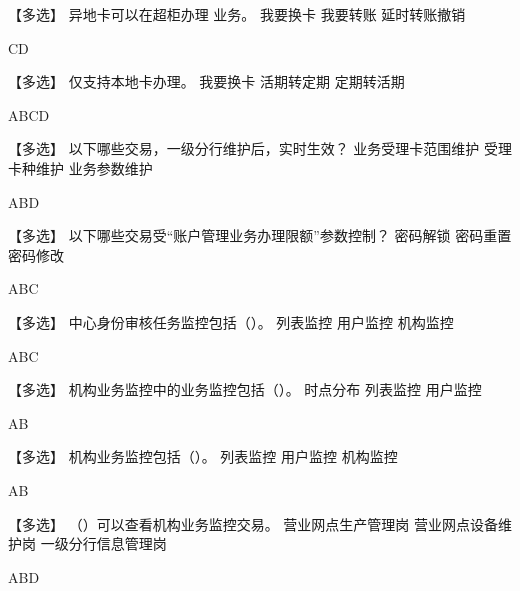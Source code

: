 \documentclass[kindlepaper]{BHCexam4kindle}
\begin{document}
\begin{questions}
\qs 【多选】 异地卡可以在超柜办理     业务。 \xx
{} {  我要换卡 } { 我要转账 } { 延时转账撤销 }
\begin{solution} CD \end{solution}
\qs 【多选】      仅支持本地卡办理。 \xx
{} {  我要换卡 } { 活期转定期 } { 定期转活期 }
\begin{solution} ABCD \end{solution}
\qs 【多选】 以下哪些交易，一级分行维护后，实时生效？ \xx
{} {  业务受理卡范围维护 } { 受理卡种维护 } { 业务参数维护 }
\begin{solution} ABD \end{solution}
\qs 【多选】 以下哪些交易受“账户管理业务办理限额”参数控制？ \xx
{} {  密码解锁 } { 密码重置 } { 密码修改 }
\begin{solution} ABC \end{solution}
\qs 【多选】 中心身份审核任务监控包括（）。 \xx
{} {  列表监控 } { 用户监控 } { 机构监控 }
\begin{solution} ABC \end{solution}
\qs 【多选】 机构业务监控中的业务监控包括（）。 \xx
{} {  时点分布 } { 列表监控 } { 用户监控 }
\begin{solution} AB \end{solution}
\qs 【多选】 机构业务监控包括（）。 \xx
{} {  列表监控 } { 用户监控 } { 机构监控 }
\begin{solution} AB \end{solution}
\qs 【多选】 （）可以查看机构业务监控交易。 \xx
{} {  营业网点生产管理岗 } { 营业网点设备维护岗 } { 一级分行信息管理岗 }
\begin{solution} ABD \end{solution}

\end{questions}
\end{document}
